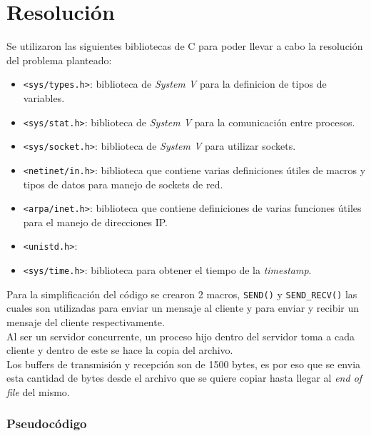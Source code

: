 \section{Resolución}

Se utilizaron las siguientes bibliotecas de C para poder llevar a cabo la resolución del problema planteado:
\begin{itemize}
    \item \texttt{<sys/types.h>}: biblioteca de \textit{System V} para la definicion de tipos de variables.
    \item \texttt{<sys/stat.h>}: biblioteca de \textit{System V} para la comunicación entre procesos.
    \item \texttt{<sys/socket.h>}: biblioteca de \textit{System V} para utilizar sockets.
    \item \texttt{<netinet/in.h>}: biblioteca que contiene varias definiciones útiles de macros y tipos de datos para manejo de sockets de red.
    \item \texttt{<arpa/inet.h>}: biblioteca que contiene definiciones de varias funciones útiles para el manejo de direcciones IP.
    \item \texttt{<unistd.h>}: 
    \item \texttt{<sys/time.h>}: biblioteca para obtener el tiempo de la \textit{timestamp}.
\end{itemize}

Para la simplificación del código se crearon 2 macros, \texttt{SEND()} y \texttt{SEND\_RECV()} las cuales son utilizadas para enviar un mensaje al cliente y para enviar y recibir un mensaje del cliente respectivamente.\\

Al ser un servidor concurrente, un proceso hijo dentro del servidor toma a cada cliente y dentro de este se hace la copia del archivo.\\

Los buffers de transmisión y recepción son de 1500 bytes, es por eso que se envia esta cantidad de bytes desde el archivo que se quiere copiar hasta llegar al \textit{end of file} del mismo.\\

\subsubsection{Pseudocódigo}

